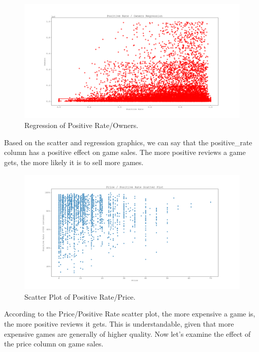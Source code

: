 \documentclass[conference]{IEEEtran}
\begin{document}
\begin{figure}[h]
  \includegraphics[width=\linewidth]{assets-2/positive_rate_owners_regression.png}
  \caption{Regression of Positive Rate/Owners.}
  \label{fig:positive_rate_owners2}
\end{figure}
\FloatBarrier

Based on the scatter and regression graphics, we can say that the positive\_rate column has a positive effect on game sales. The more positive reviews a game gets, the more likely it is to sell more games.

\begin{figure}[h]
  \includegraphics[width=\linewidth, height=6cm]{assets-2/price_and_positive_rate.png}
  \caption{Scatter Plot of Positive Rate/Price.}
  \label{fig:price_positive_rate1}
\end{figure}
\FloatBarrier

According to the Price/Positive Rate scatter plot, the more expensive a game is, the more positive reviews it gets. This is understandable, given that more expensive games are generally of higher quality. Now let's examine the effect of the price column on game sales.
\end{document}
